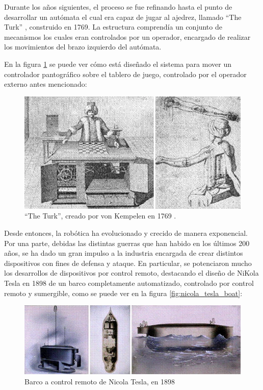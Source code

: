 Durante los años siguientes, el proceso se fue refinando hasta el punto de desarrollar un autómata
el cual era capaz de jugar al ajedrez, llamado ``The Turk'' \cite{standage_tom_turk_2002}, construido
en 1769. La estructura comprendía un conjunto de mecanismos los cuales eran controlados por un operador,
encargado de realizar los movimientos del brazo izquierdo del autómata.

En la figura \ref{fig:turk} se puede ver cómo está diseñado el sistema para mover un controlador 
pantográfico sobre el tablero de juego, controlado por el operador externo antes mencionado:

\begin{figure}[H]
    \centering
    \includegraphics[width=.75\linewidth]{pictures/chess_evolution.png}
    \caption{``The Turk'', creado por von Kempelen en 1769 \cite{standagetomTurkLifeTimes2002a}.}
    \label{fig:turk}
\end{figure}

Desde entonces, la robótica ha evolucionado y crecido de manera exponencial. Por una parte, debidas
las distintas guerras que han habido en los últimos 200 años, se ha dado un gran impulso a la 
industria encargada de crear distintos dispositivos con fines de defensa y ataque. En particular,
se potenciaron mucho los desarrollos de dispositivos por control remoto, destacando el diseño de
NiKola Tesla en 1898 de un barco completamente automatizado, controlado por control remoto y sumergible,
como se puede ver en la figura \ref{fig:nicola_tesla_boat}:

\begin{figure}[H]
    \centering
    \includegraphics[width=.75\linewidth]{pictures/nicola_tesla_boat.png}
    \caption{Barco a control remoto de Nicola Tesla, en 1898 \cite{belarminojandmoranmeandfiroozifandcapellosandkolioseandperrottimTeslaRobotDawn2005a}}
\end{figure}

